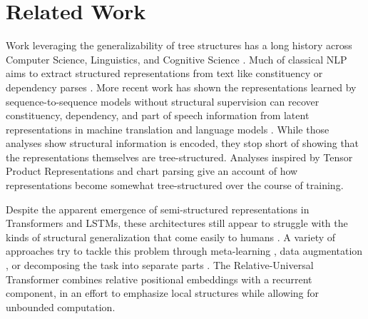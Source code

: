 \section{Related Work}
Work leveraging the generalizability of tree structures has a long history across Computer Science, Linguistics, and Cognitive Science \citep{chomsky_aspects_1965,mccarthy1960recursive, sakai1961syntax,  Smolensky1990TensorPV, steedman1987combinatory}. Much of classical NLP aims to extract structured representations from text like constituency or dependency parses \citep[for overview:][]{cuetos2013parsing, lopez2008statistical}. More recent work has shown the representations learned by sequence-to-sequence models without structural supervision can recover constituency, dependency, and part of speech information from latent representations in machine translation and language models \citep{belinkov2019analysis, blevins2018deep}. While those analyses show structural information is encoded, they stop short of showing that the representations themselves are tree-structured. Analyses inspired by Tensor Product Representations \citep{mccoy2018rnns, soulos2019discovering} and chart parsing \citep{murty2022characterizing} give an account of how representations become somewhat tree-structured over the course of training.%

Despite the apparent emergence of semi-structured representations in Transformers and LSTMs, these architectures still appear to struggle with the kinds of structural generalization that come easily to humans \citep{Lake_2018_GeneralizationSystematicityCompositional, kim_cogs_2020, keysers2020measuring}. A variety of approaches try to tackle this problem through meta-learning \citep{lake2019compositional, conklin2021meta}, data augmentation \citep{andreas_good-enough_2020}, or decomposing the task into separate parts \citep{ russin2019compositional, lindemann2023compositional}. The Relative-Universal Transformer \citep{csordas-etal-2021-devil} combines relative positional embeddings with a recurrent component, in an effort to emphasize local structures while allowing for unbounded computation.




